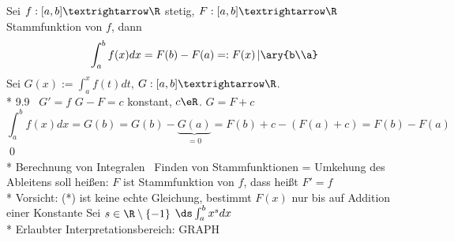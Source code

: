 Sei $f:[a,b]→\R$ stetig, $F:[a,b]→\R$ Stammfunktion von $f$, dann $$\int_a^{b}f(x)dx=F(b)-F(a)=:F(x)\left|\ary{b\\a}\right.$$
\bew
Sei $G(x):=\int_a^xf(t)dt$, $G:[a,b]→\R$.\\*
9.9 \Rarr\ $G'=f$  $G-F=c$ konstant, $c\eR$. $G=F+c$
$$\int_a^bf(x)dx=G(b)=G(b)-\underbrace{G(a)}_{=0}=F(b)+c-(F(a)+c)=F(b)-F(a)$$\qed\\*
 Berechnung von Integralen \equ\ Finden von Stammfunktionen = Umkehung des Ableitens
soll heißen: $F$ ist Stammfunktion von $f$, dass heißt $F'=f$\\*
Vorsicht: (*) ist keine echte Gleichung, bestimmt $F(x)$ nur bis auf Addition einer Konstante
\bsp
Sei $s\in\R\setminus\{-1\}$ $\ds\int_a^b x^s dx$\\*
Erlaubter Interpretationsbereich: GRAPH
\bsp
